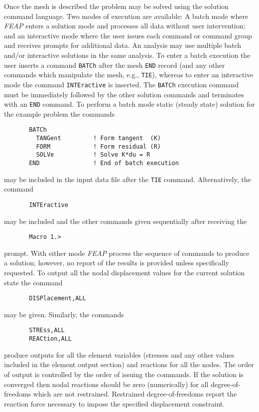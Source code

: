 Once the mesh is described the problem may be solved using
the solution command language.  Two modes of execution are available:
A batch mode where {\sl FEAP} enters a solution mode and processes all data
without user intervention; and an interactive mode where the user
issues each command or command group and receives prompts for additional data.
An analysis may use multiple batch and/or interactive solutions in the same
analysis.  To enter a batch execution the user inserts a command {\tt BATCh}
after the mesh {\tt END} record (and any other commands which manipulate
the mesh, e.g., {\tt TIE}), whereas to enter an interactive mode the
command {\tt INTEractive} is inserted.  The {\tt BATCh} execution command
must be immediately followed by the other solution commands and terminates
with an {\tt END} command.  To perform a batch mode
static (steady state) solution for the example problem the commands
\begin{verbatim}
       BATCh
         TANGent         ! Form tangent  (K)
         FORM            ! Form residual (R)
         SOLVe           ! Solve K*du = R
       END               ! End of batch execution
\end{verbatim}
may be included in the input data file after the {\tt TIE} command.
Alternatively, the command
\begin{verbatim}
       INTEractive
\end{verbatim}
may be included and the other commands given sequentially after receiving
the
\begin{verbatim}
       Macro 1.>
\end{verbatim}
prompt.  With either mode {\sl FEAP} process the sequence of commands to produce
a solution; however, no report of the results is provided unless specifically
requested.  To output all the nodal displacement values for the current
solution state the command
\begin{verbatim}
       DISPlacement,ALL
\end{verbatim}
may be given.  Similarly, the commands
\begin{verbatim}
       STREss,ALL
       REACtion,ALL
\end{verbatim}
produce outputs for all the element variables (stresses and any other values
included in the element output section) and reactions for all the nodes.
The order of output is controlled by the order of issuing the commands.  If the
solution is converged then nodal reactions should be zero (numerically) for
all degree-of-freedoms which are not restrained.  Restrained degree-of-freedoms
report the reaction force necessary to impose the specified
displacement constraint.

